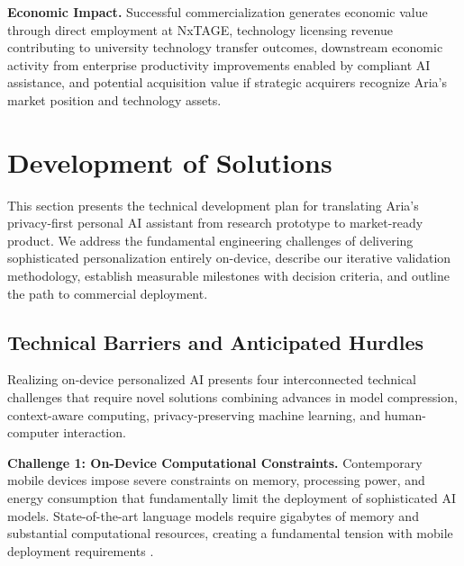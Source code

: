 \documentclass[11pt]{article}
\begin{document}
\textbf{Economic Impact.} Successful commercialization generates economic value through direct employment at NxTAGE, technology licensing revenue contributing to university technology transfer outcomes, downstream economic activity from enterprise productivity improvements enabled by compliant AI assistance, and potential acquisition value if strategic acquirers recognize Aria's market position and technology assets.


\vspace*{-8pt}
\section{Development of Solutions}
\label{sec:development}
\vspace*{-8pt}
This section presents the technical development plan for translating Aria's privacy-first personal AI assistant from research prototype to market-ready product. We address the fundamental engineering challenges of delivering sophisticated personalization entirely on-device, describe our iterative validation methodology, establish measurable milestones with decision criteria, and outline the path to commercial deployment.

\vspace*{-8pt}
\subsection{Technical Barriers and Anticipated Hurdles}
\vspace*{-8pt}
Realizing on-device personalized AI presents four interconnected technical challenges that require novel solutions combining advances in model compression, context-aware computing, privacy-preserving machine learning, and human-computer interaction.

\textbf{Challenge 1: On-Device Computational Constraints.}
Contemporary mobile devices impose severe constraints on memory, processing power, and energy consumption that fundamentally limit the deployment of sophisticated AI models. State-of-the-art language models require gigabytes of memory and substantial computational resources, creating a fundamental tension with mobile deployment requirements \cite{han2016deep}. 
\end{document}
